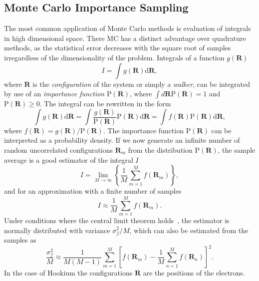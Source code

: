 \documentclass[final,3p,times,twocolumn]{elsarticle}
\begin{document}
	\subsection{Monte Carlo Importance Sampling}
	\label{subsec:Impl-MCIP}
	The most common application of Monte Carlo methods is evaluation of integrals in high dimensional space. There MC has a distinct advantage over quadrature methods, as the statistical error decreases with the square root of samples irregardless of the dimensionality of the problem. Integrals of a function $g(\mathbf{R})$
	\begin{equation}
		I=\int g(\mathbf{R}) \mathrm{d} \mathbf{R},
	\end{equation}
	where $\mathbf{R}$ is the \emph{configuration} of the system or simply a \emph{walker}, can be integrated by use of an \emph{importance function} $\mathrm{P}(\mathbf{R})$, where $\int d \mathbf{R} \text{P}(\mathbf{R})=1$ and $\mathrm{P} (\mathbf{R}) \geq 0$. The integral can be rewritten in the form
	\begin{equation}
		\int g(\mathbf{R}) \mathrm{d} \mathbf{R} = \int \frac{g(\mathbf{R})}{\mathrm{P}(\mathbf{R})} \mathrm{P}(\mathbf{R}) \mathrm{d} \mathbf{R} = \int f(\mathbf{R})\mathrm{P}(\mathbf{R}) \mathrm{d} \mathbf{R},
	\end{equation}
	where $f(\mathbf{R}) = g(\mathbf{R}) / \mathrm{P}(\mathbf{R})$.
	The importance function $\mathrm{P}(\mathbf{R})$ can be interpreted as a probability density. If we now generate an infinite number of random uncorrelated configurations $\mathbf{R}_m$ from the distribution $\mathrm{P}(\mathbf{R})$, the sample average is a good estimator of the integral $I$
	\begin{equation}
		I=\lim _{M \rightarrow \infty}\left\{\frac{1}{M} \sum_{m=1}^{M} f\left(\mathbf{R}_{m}\right)\right\},
	\end{equation}
	and for an approximation with a finite number of samples
	\begin{equation}
		I \approx \frac{1}{M} \sum_{m=1}^{M} f\left(\mathbf{R}_{m}\right).
	\end{equation}
	Under conditions where the central limit theorem holds~\cite{foulkes2001quantum}, the estimator is normally distributed with variance $\sigma_{f}^{2}/M$, which can also be estimated from the samples as
	\begin{equation}
		\frac{\sigma_{f}^{2}}{M} \approx \frac{1}{M(M-1)} \sum_{m=1}^{M}\left[f\left(\mathbf{R}_{m}\right)-\frac{1}{M} \sum_{n=1}^{M} f\left(\mathbf{R}_{n}\right)\right]^{2}.
	\end{equation}
	In the case of Hookium the configurations $\mathbf{R}$ are the positions of the electrons.
	
\end{document}
